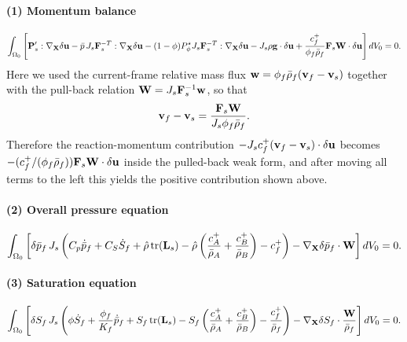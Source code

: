 \documentclass[11pt]{article}
\begin{document}
\paragraph{(1) Momentum balance}
\begin{equation}
\int_{\Omega_0}\left[\mathbf{P}_s':\nabla_{\mathbf{X}}\delta\mathbf{u}-\bar p\,J_s\mathbf{F}_s^{-T}:\nabla_{\mathbf{X}}\delta\mathbf{u} -(1-\phi)P_\phi^\star J_s\mathbf{F}_s^{-T}:\nabla_{\mathbf{X}}\delta\mathbf{u} -J_s\rho\mathbf{g}\cdot \delta\mathbf{u} +\frac{c_f^+}{\phi_f\bar\rho_f}\mathbf{F}_s\mathbf{W}\cdot \delta\mathbf{u}\right]dV_0=0.
\label{eq:wf_mom}
\end{equation}
Here we used the current-frame relative mass flux $\mathbf{w}=\phi_f\bar\rho_f(\mathbf{v}_f-\mathbf{v}_s)$ together with the pull-back relation $\mathbf{W}=J_s\mathbf{F}_s^{-1}\mathbf{w}$, so that
\begin{equation}
  \mathbf{v}_f-\mathbf{v}_s = \frac{\mathbf{F}_s\mathbf{W}}{J_s\phi_f\bar\rho_f}.
\end{equation}
Therefore the reaction-momentum contribution $-J_s c_f^+(\mathbf{v}_f-\mathbf{v}_s)\cdot\delta\mathbf{u}$ becomes $-(c_f^+/(\phi_f\bar\rho_f))\mathbf{F}_s\mathbf{W}\cdot\delta\mathbf{u}$ inside the pulled-back weak form, and after moving all terms to the left this yields the positive contribution shown above.

\paragraph{(2) Overall pressure equation}
\begin{equation}
\int_{\Omega_0}\left[\delta\bar p_f\,J_s\left(C_p\dot{\bar p}_f + C_S\dot S_f + \hat\rho\,\mathrm{tr}(\mathbf{L}_s) - \hat\rho\left(\frac{c_A^+}{\bar\rho_A} + \frac{c_B^+}{\bar\rho_B}\right) - c_f^+\right) - \nabla_{\mathbf{X}}\delta\bar p_f\cdot\mathbf{W}\right]dV_0=0.
\label{eq:wf_pressure}
\end{equation}

\paragraph{(3) Saturation equation}
\begin{equation}
\int_{\Omega_0}\left[\delta S_f\,J_s\left(\phi\dot S_f + \frac{\phi_f}{K_f}\dot{\bar p}_f + S_f\,\mathrm{tr}(\mathbf{L}_s) - S_f\left(\frac{c_A^+}{\bar\rho_A} + \frac{c_B^+}{\bar\rho_B}\right) - \frac{c_f^+}{\bar\rho_f}\right) - \nabla_{\mathbf{X}}\delta S_f\cdot\frac{\mathbf{W}}{\bar\rho_f}\right]dV_0=0.
\label{eq:wf_saturation}
\end{equation}
\end{document}
